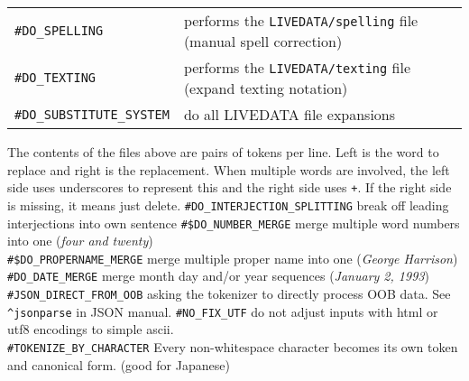 \documentclass[]{article}
\begin{document}
\begin{longtable}[]{@{}ll@{}}
\begin{minipage}[t]{0.31\columnwidth}\raggedright\strut
\texttt{\#DO\_SPELLING}\strut
\end{minipage} & \begin{minipage}[t]{0.63\columnwidth}\raggedright\strut
performs the \texttt{LIVEDATA/spelling} file (manual spell
correction)\strut
\end{minipage}\tabularnewline
\begin{minipage}[t]{0.31\columnwidth}\raggedright\strut
\texttt{\#DO\_TEXTING}\strut
\end{minipage} & \begin{minipage}[t]{0.63\columnwidth}\raggedright\strut
performs the \texttt{LIVEDATA/texting} file (expand texting
notation)\strut
\end{minipage}\tabularnewline
\begin{minipage}[t]{0.31\columnwidth}\raggedright\strut
\texttt{\#DO\_SUBSTITUTE\_SYSTEM}\strut
\end{minipage} & \begin{minipage}[t]{0.63\columnwidth}\raggedright\strut
do all LIVEDATA file expansions\strut
\end{minipage}\tabularnewline
\bottomrule
\end{longtable}

The contents of the files above are pairs of tokens per line. Left is
the word to replace and right is the replacement. When multiple words
are involved, the left side uses underscores to represent this and the
right side uses \texttt{+}. If the right side is missing, it means just
delete. \textbar{} \texttt{\#DO\_INTERJECTION\_SPLITTING} \textbar{}
break off leading interjections into own sentence \textbar{}
\texttt{\#\$DO\_NUMBER\_MERGE} \textbar{} merge multiple word numbers
into one (\emph{four and twenty})\\
\textbar{} \texttt{\#\$DO\_PROPERNAME\_MERGE} \textbar{} merge multiple
proper name into one (\emph{George Harrison}) \textbar{}
\texttt{\#DO\_DATE\_MERGE} \textbar{} merge month day and/or year
sequences (\emph{January 2, 1993}) \textbar{}
\texttt{\#JSON\_DIRECT\_FROM\_OOB} \textbar{} asking the tokenizer to
directly process OOB data. See \texttt{\^{}jsonparse} in JSON manual.
\textbar{} \texttt{\#NO\_FIX\_UTF} \textbar{} do not adjust inputs with
html or utf8 encodings to simple ascii.\\
\textbar{} \texttt{\#TOKENIZE\_BY\_CHARACTER} \textbar{} Every
non-whitespace character becomes its own token and canonical form. (good
for Japanese)
\end{document}
